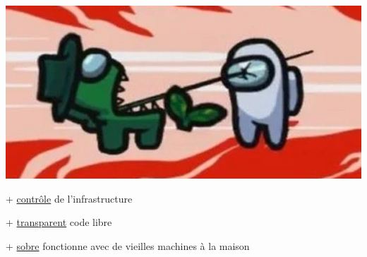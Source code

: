 \documentclass[aspectratio=169]{beamer}
\begin{document}
\begin{frame}[t]
\begin{columns}[t]
\begin{column}{0.5\textwidth}
\begin{center}
	\includegraphics[scale=1]{img/death.jpg}
\end{center}

\vspace{0.4cm}

+ \underline{contrôle} de l'infrastructure

+ \underline{transparent} code libre 

+ \underline{sobre} fonctionne avec de vieilles machines à la maison
\end{column}
\end{columns}

\end{frame}
\end{document}
